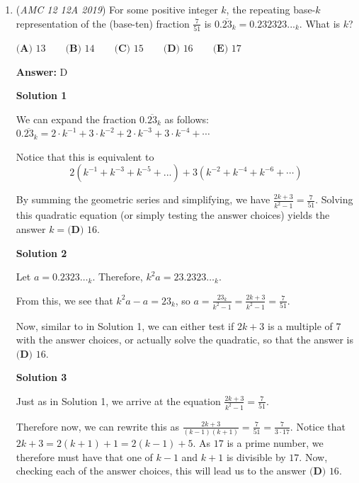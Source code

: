 \begin{enumerate}
 Education, the Study of Everything

 


	\item (\textit{AMC 12 12A 2019}) For some positive integer $k$, the repeating base-$k$ representation of the (base-ten) fraction $\frac{7}{51}$ is $0.\overline{23}_k = 0.232323..._k$. What is $k$?


 $\textbf{(A) } 13 \qquad\textbf{(B) } 14 \qquad\textbf{(C) } 15 \qquad\textbf{(D) } 16 \qquad\textbf{(E) } 17$

 \textbf{Answer: }D



\textbf{Solution 1}

We can expand the fraction $0.\overline{23}_k$ as follows: $0.\overline{23}_k = 2\cdot k^{-1} + 3 \cdot k^{-2} + 2 \cdot k^{-3} + 3 \cdot k^{-4} + \cdots$

 Notice that this is equivalent to 
 \[2( k^{-1} + k^{-3} + k^{-5} + ... ) + 3 (k^{-2} + k^{-4} + k^{-6} + \cdots )\]

 By summing the geometric series and simplifying, we have $\frac{2k+3}{k^2-1} = \frac{7}{51}$. Solving this quadratic equation (or simply testing the answer choices) yields the answer $k = \boxed{\textbf{(D) }16}$.

 



\textbf{Solution 2}

Let $a = 0.2323\dots_k$. Therefore, $k^2a=23.2323\dots_k$.

 From this, we see that $k^2a-a=23_k$, so $a = \frac{23_k}{k^2-1} = \frac{2k+3}{k^2-1} = \frac{7}{51}$.

 Now, similar to in Solution 1, we can either test if $2k+3$ is a multiple of $7$ with the answer choices, or actually solve the quadratic, so that the answer is $\boxed{\textbf{(D) }16}$.

 



\textbf{Solution 3}

Just as in Solution 1, we arrive at the equation $\frac{2k+3}{k^2-1}=\frac{7}{51}$.

 Therefore now, we can rewrite this as $\frac{2k+3}{(k-1)(k+1)}=\frac{7}{51}=\frac{7}{3\cdot 17}$. Notice that $2k+3=2(k+1)+1=2(k-1)+5$. As $17$ is a prime number, we therefore must have that one of $k-1$ and $k+1$ is divisible by $17$. Now, checking each of the answer choices, this will lead us to the answer $\boxed{\textbf{(D) }16}$.


\end{enumerate}
